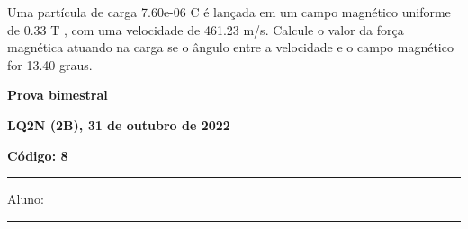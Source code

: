 \documentclass[12pt, addpoints]{exam}
\begin{document}
\begin{questions}
\begin{multicols*}{2}
\begin{oneparchoices}
\end{oneparchoices}
\question[20] Uma partícula de carga 7.60e-06 C é lançada em um campo magnético uniforme de    0.33 T , com uma velocidade de 461.23 m/s. Calcule o valor da força magnética atuando na carga se o ângulo entre a velocidade e o campo magnético for   13.40 graus.

\begin{oneparchoices}
\end{oneparchoices}
\end{multicols*}
\end{questions}
\newpage
        \begin{minipage}[b]{0.75\linewidth}
            \begin{flushleft}
                {\bf \large Prova bimestral}
            \end{flushleft}
            \begin{flushleft}
                {\bf \large LQ2N (2B), 31 de outubro de 2022}
            \end{flushleft}
        \end{minipage}
        \begin{minipage}[b]{0.20\linewidth}
            \begin{flushright}
                {\bf \large Código: 8}
            \end{flushright}
        \end{minipage}
        \vspace{0.5cm} \hrule \vspace{0.5cm}
        \begin{minipage}{0.75\linewidth}
            Aluno:
        \end{minipage}
        \vspace{0.5cm} \hrule \vspace{0.5cm}
\end{document}
